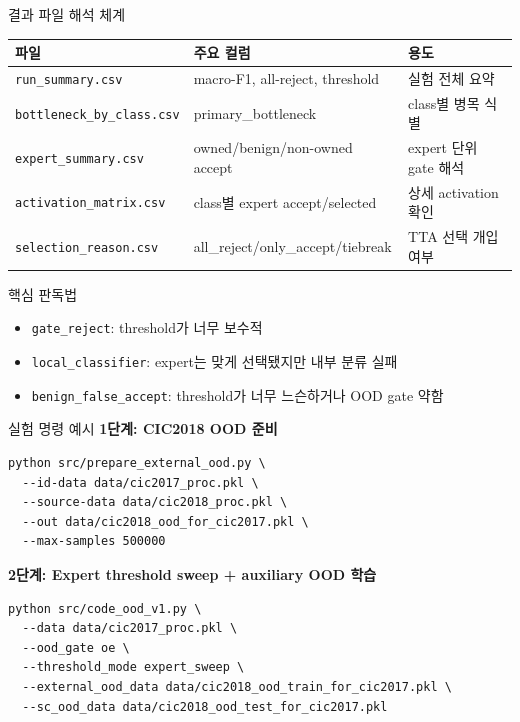 \documentclass[aspectratio=169]{beamer}
\begin{document}
\begin{frame}{결과 파일 해석 체계}
\begin{center}
\begin{tabular}{lll}
\toprule
파일 & 주요 컬럼 & 용도 \\
\midrule
\texttt{run\_summary.csv} & macro-F1, all-reject, threshold & 실험 전체 요약 \\
\texttt{bottleneck\_by\_class.csv} & primary\_bottleneck & class별 병목 식별 \\
\texttt{expert\_summary.csv} & owned/benign/non-owned accept & expert 단위 gate 해석 \\
\texttt{activation\_matrix.csv} & class별 expert accept/selected & 상세 activation 확인 \\
\texttt{selection\_reason.csv} & all\_reject/only\_accept/tiebreak & TTA 선택 개입 여부 \\
\bottomrule
\end{tabular}
\end{center}

\vspace{0.6em}
\begin{block}{핵심 판독법}
\begin{itemize}
  \item \texttt{gate\_reject}: threshold가 너무 보수적
  \item \texttt{local\_classifier}: expert는 맞게 선택됐지만 내부 분류 실패
  \item \texttt{benign\_false\_accept}: threshold가 너무 느슨하거나 OOD gate 약함
\end{itemize}
\end{block}
\end{frame}

\begin{frame}[fragile]{실험 명령 예시}
\textbf{1단계: CIC2018 OOD 준비}
\begin{verbatim}
python src/prepare_external_ood.py \
  --id-data data/cic2017_proc.pkl \
  --source-data data/cic2018_proc.pkl \
  --out data/cic2018_ood_for_cic2017.pkl \
  --max-samples 500000
\end{verbatim}

\vspace{0.3em}
\textbf{2단계: Expert threshold sweep + auxiliary OOD 학습}
\begin{verbatim}
python src/code_ood_v1.py \
  --data data/cic2017_proc.pkl \
  --ood_gate oe \
  --threshold_mode expert_sweep \
  --external_ood_data data/cic2018_ood_train_for_cic2017.pkl \
  --sc_ood_data data/cic2018_ood_test_for_cic2017.pkl
\end{verbatim}
\end{frame}
\end{document}

